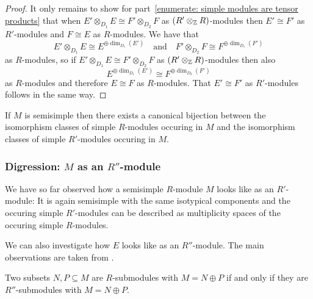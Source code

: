 \begin{proof}
  It only remains to show for part~\ref*{enumerate: simple modules are tensor products} that when $E' \otimes_{D_1} E \cong F' \otimes_{D_2} F$ as $(R' \otimes_{\mathbb{Z}} R)$-modules then $E' \cong F'$ as $R'$-modules and $F \cong E$ as $R$-modules.
  We have that
  \[
          E' \otimes_{D_1} E
    \cong E^{\oplus \dim_{D_1}(E')}
    \quad\text{and}\quad
          F' \otimes_{D_2} F
    \cong F^{\oplus \dim_{D_1}(F')}
  \]
  as $R$-modules, so if $E' \otimes_{D_1} E \cong F' \otimes_{D_2} F$ as $(R' \otimes_{\mathbb{Z}} R)$-modules then also
  \[
          E^{\oplus \dim_{D_1}(E')}
    \cong F^{\oplus \dim_{D_2}(F')}
  \]
  as $R$-modules and therefore $E \cong F$ as $R$-modules.
  That $E' \cong F'$ as $R'$-modules follows in the same way.
\end{proof}


\begin{corollary}
  If $M$ is semisimple then there exists a canonical bijection between the isomorphism classes of simple $R$-modules occuring in $M$ and the isomorphism classes of simple $R'$-modules occuring in $M$.
\end{corollary}







\subsubsection{Digression: $M$ as an $R''$-module}

\begin{fluff}
  We have so far observed how a semisimple $R$-module $M$ looks like as an $R'$-module:
  It is again semisimple with the same isotypical components and the occuring simple $R'$-modules can be described as multiplicity spaces of the occuring simple $R$-modules.
  
  We can also investigate how $E$ looks like as an $R''$-module.
  The main observations are taken from \cite[Chapter~2.6]{DaSilva2017NonCommutative}.
\end{fluff}


\begin{lemma}
  \label{lemma: same direct sum decompositions}
  Two subsets $N, P \subseteq M$ are $R$-submodules with $M = N \oplus P$ if and only if they are $R''$-submodules with $M = N \oplus P$.
\end{lemma}


